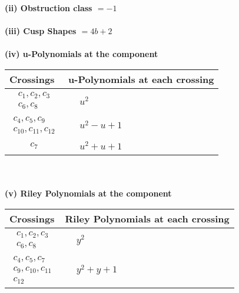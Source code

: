 \documentclass[1p]{elsarticle_modified}
\theoremstyle{definition}
\begin{document}
\flushleft \textbf{(ii) Obstruction class $= -1$}\\~\\
\flushleft \textbf{(iii) Cusp Shapes $= 4 b+2$}\\~\\
\newpage\renewcommand{\arraystretch}{1}
\flushleft \textbf{(iv) u-Polynomials at the component}\newline \\
\begin{tabular}{m{50pt}|m{274pt}}
Crossings & \hspace{64pt}u-Polynomials at each crossing \\
\hline $$\begin{aligned}c_{1},c_{2},c_{3}\\c_{6},c_{8}\end{aligned}$$&$\begin{aligned}
&u^2
\end{aligned}$\\
\hline $$\begin{aligned}c_{4},c_{5},c_{9}\\c_{10},c_{11},c_{12}\end{aligned}$$&$\begin{aligned}
&u^2- u+1
\end{aligned}$\\
\hline $$\begin{aligned}c_{7}\end{aligned}$$&$\begin{aligned}
&u^2+u+1
\end{aligned}$\\
\hline
\end{tabular}\\~\\
\newpage\renewcommand{\arraystretch}{1}
\flushleft \textbf{(v) Riley Polynomials at the component}\newline \\
\begin{tabular}{m{50pt}|m{274pt}}
Crossings & \hspace{64pt}Riley Polynomials at each crossing \\
\hline $$\begin{aligned}c_{1},c_{2},c_{3}\\c_{6},c_{8}\end{aligned}$$&$\begin{aligned}
&y^2
\end{aligned}$\\
\hline $$\begin{aligned}c_{4},c_{5},c_{7}\\c_{9},c_{10},c_{11}\\c_{12}\end{aligned}$$&$\begin{aligned}
&y^2+y+1
\end{aligned}$\\
\hline
\end{tabular}\\~\\
\end{document}
